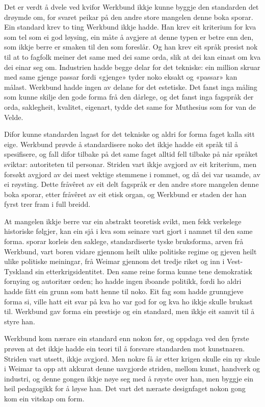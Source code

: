 Det er verdt å dvele ved kvifor Werkbund ikkje kunne byggje den standarden det drøymde om, for svaret peikar på den andre store mangelen denne boka sporar. Ein standard krev to ting Werkbund ikkje hadde. Han krev eit kriterium for kva som tel som ei god løysing, ein måte å avgjere at denne typen er betre enn den, som ikkje berre er smaken til den som foreslår. Og han krev eit språk presist nok til at to fagfolk meiner det same med dei same orda, slik at dei kan einast om kva dei einar seg om. Industrien hadde begge delar for det tekniske: ein million skruar med same gjenge passar fordi «gjenge» tyder noko eksakt og «passar» kan målast. Werkbund hadde ingen av delane for det estetiske. Det fanst inga måling som kunne skilje den gode forma frå den dårlege, og det fanst inga fagspråk der orda, saklegheit, kvalitet, eigenart, tydde det same for Muthesius som for van de Velde.

Difor kunne standarden lagast for det tekniske og aldri for forma faget kalla sitt eige. Werkbund prøvde å standardisere noko det ikkje hadde eit språk til å spesifisere, og fall difor tilbake på det same faget alltid fell tilbake på når språket sviktar: autoriteten til personar. Striden vart ikkje avgjord av eit kriterium, men forsøkt avgjord av dei mest vektige stemmene i rommet, og då dei var usamde, av ei røysting. Dette fråvêret av eit delt fagspråk er den andre store mangelen denne boka sporar, etter fråvêret av eit etisk organ, og Werkbund er staden der han fyrst trer fram i full breidd.

At mangelen ikkje berre var ein abstrakt teoretisk svikt, men fekk verkelege historiske følgjer, kan ein sjå i kva som seinare vart gjort i namnet til den same forma. \textcite{betts2004} sporar korleis den saklege, standardiserte tyske bruksforma, arven frå Werkbund, vart boren vidare gjennom heilt ulike politiske regime og gjeven heilt ulike politiske meiningar, frå Weimar gjennom det tredje riket og inn i Vest-Tyskland sin etterkrigsidentitet. Den same reine forma kunne tene demokratisk fornying og autoritær orden; ho hadde ingen iboande politikk, fordi ho aldri hadde fått ein grunn som batt henne til noko. Eit fag som hadde grunngjeve forma si, ville hatt eit svar på kva ho var god for og kva ho ikkje skulle brukast til. Werkbund gav forma ein prestisje og ein standard, men ikkje eit samvit til å styre han.

\vignett

Werkbund kom nærare ein standard enn nokon før, og oppdaga ved den fyrste prøven at det ikkje hadde ein teori til å forsvare standarden mot kunstnaren. Striden vart utsett, ikkje avgjord. Men nokre få år etter krigen skulle ein ny skule i Weimar ta opp att akkurat denne uavgjorde striden, mellom kunst, handverk og industri, og denne gongen ikkje nøye seg med å røyste over han, men byggje ein heil pedagogikk for å løyse han. Det vart det næraste designfaget nokon gong kom ein vitskap om form.

